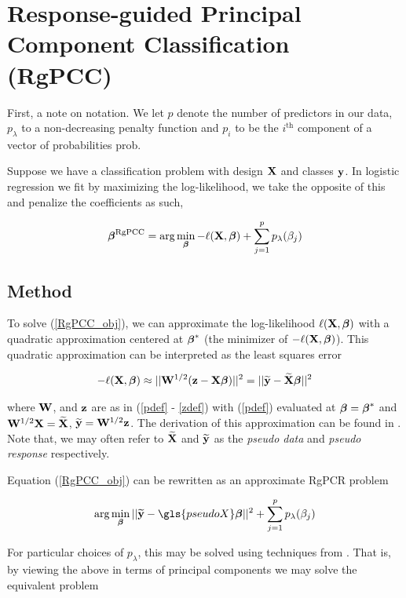 \documentclass[main.tex]{subfiles}
\begin{document}
\section{Response-guided Principal Component Classification (RgPCC)}

First, a note on notation. We let $p$ denote the number of predictors in our data, $p_{\lambda}$ to a non-decreasing penalty function and $p_i$ to be the $i^{\text{th}}$ component of a vector of probabilities \gls{prob}.

Suppose we have a classification problem with design $\mathbf{X}$ and classes $\mathbf{y}$. In logistic regression we fit by maximizing the log-likelihood, we take the opposite of this and penalize the coefficients as such,

\begin{align}
	\boldsymbol \beta^{\text{RgPCC}} = \text{arg} \min_{\boldsymbol \beta} - \ell(\mathbf{X}, \boldsymbol \beta) + \sum_{j = 1}^p p_{\lambda}(\beta_j) \label{RgPCC_obj}
\end{align}

\subsection{Method}
To solve (\ref{RgPCC_obj}), we can approximate the log-likelihood $\ell(\mathbf{X}, \boldsymbol \beta)$ with a quadratic approximation centered at $\boldsymbol \beta^*$ (the minimizer of $- \ell(\mathbf{X}, \boldsymbol \beta)$). This quadratic approximation can be interpreted as the least squares error

\begin{align}
	- \ell(\mathbf{X}, \boldsymbol \beta) \approx ||\mathbf{W}^{1/2} (\mathbf{z} - \mathbf{X} \boldsymbol \beta)||^2 = || \widetilde{\mathbf{y}} - \widetilde{\mathbf{X}} \boldsymbol \beta ||^2
\end{align}

where $\mathbf{W}$, and $\mathbf{z}$ are as in (\ref{pdef} - \ref{zdef}) with (\ref{pdef}) evaluated at $\boldsymbol \beta = \boldsymbol \beta^*$ and $\mathbf{W}^{1/2} \mathbf{X} = \widetilde{\mathbf{X}}$, $\widetilde{\mathbf{y}} = \mathbf{W}^{1/2} \mathbf{z}$. The derivation of this approximation can be found in \cite{wangleng}. Note that, we may often refer to $\widetilde{\mathbf{X}}$ and $\widetilde{\mathbf{y}}$ as the \emph{pseudo data} and \emph{pseudo response} respectively.

Equation (\ref{RgPCC_obj}) can be rewritten as an approximate RgPCR problem

\begin{align}
	\argmin_{\bbeta} || \widetilde{\y} - \gls{pseudoX} \bbeta ||^2 + \sum_{j = 1}^p p_{\lambda}(\beta_j) \label{RgPCC_obj2}
\end{align}

For particular choices of $p_{\lambda}$, this may be solved using techniques from \cite{langzou}. That is, by viewing the above in terms of principal components we may solve the equivalent problem
\end{document}
